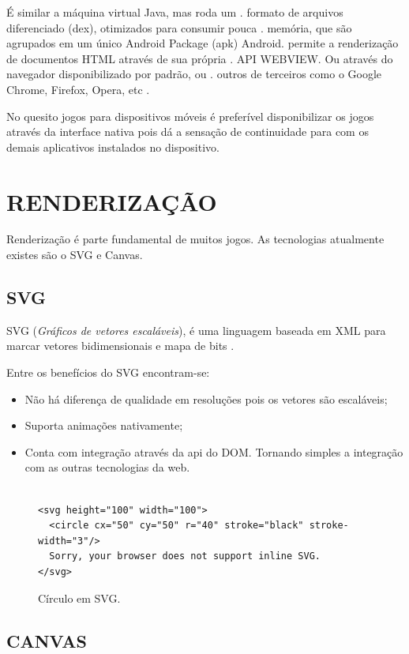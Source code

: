 \documentclass[
12pt,
a4paper,
portuges,
draft
]{report}
\begin{document}
É similar a máquina virtual Java, mas roda um  .
formato de arquivos diferenciado (dex), otimizados para consumir pouca .
memória, que são agrupados em um único Android Package (apk) Android.
permite a renderização de documentos HTML através de sua própria   .
API WEBVIEW. Ou através do navegador disponibilizado por padrão, ou  .
outros de terceiros como o Google Chrome, Firefox, Opera, etc          .

No quesito jogos para dispositivos móveis é preferível disponibilizar
os jogos através da interface nativa pois dá a sensação de
continuidade para com os demais aplicativos instalados no dispositivo.


\section{RENDERIZAÇÃO}

Renderização é parte fundamental de muitos jogos. As tecnologias atualmente existes são o SVG e Canvas.

\subsection{SVG}
SVG (\textit{Gráficos de vetores escaláveis}), é uma linguagem baseada em XML para marcar vetores bidimensionais e mapa de bits \autocite{html5mostwanted}.

Entre os benefícios do SVG encontram-se:

\begin{itemize}
\item Não há diferença de qualidade em resoluções pois os vetores são escaláveis;
\item Suporta animações nativamente;
\item Conta com integração através da api do DOM. Tornando simples a integração com as outras tecnologias da web.
\end{itemize}

\begin{figure}
\centering
\begin{verbatim}

<svg height="100" width="100">
  <circle cx="50" cy="50" r="40" stroke="black" stroke-width="3"/>
  Sorry, your browser does not support inline SVG.
</svg>

\end{verbatim}
\caption{Círculo em SVG.}
\end{figure}
\subsection{CANVAS}
\end{document}
